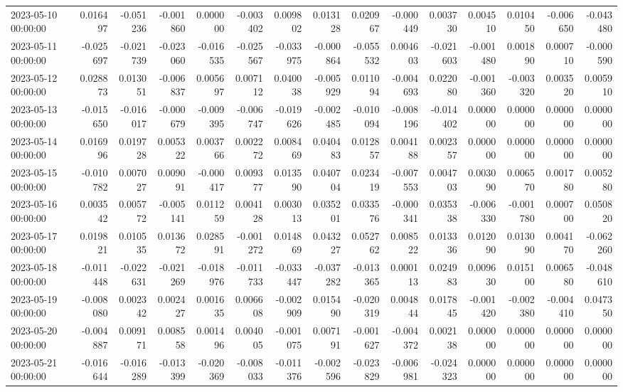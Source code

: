 \begin{tabular}{lrrrrrrrrrrrrrr}
2023-05-10 00:00:00 & 0.016497 & -0.051236 & -0.001860 & 0.000000 & -0.003402 & 0.009802 & 0.013128 & 0.020967 & -0.000449 & 0.003730 & 0.004510 & 0.010450 & -0.006650 & -0.043480 \\
2023-05-11 00:00:00 & -0.025697 & -0.021739 & -0.023060 & -0.016535 & -0.025567 & -0.033975 & -0.000864 & -0.055532 & 0.004603 & -0.021603 & -0.001480 & 0.001890 & 0.000710 & -0.000590 \\
2023-05-12 00:00:00 & 0.028873 & 0.013051 & -0.006837 & 0.005697 & 0.007112 & 0.040038 & -0.005929 & 0.011094 & -0.004693 & 0.022080 & -0.001360 & -0.003320 & 0.003520 & 0.005910 \\
2023-05-13 00:00:00 & -0.015650 & -0.016017 & -0.000679 & -0.009395 & -0.006747 & -0.019626 & -0.002485 & -0.010094 & -0.008196 & -0.014402 & 0.000000 & 0.000000 & 0.000000 & 0.000000 \\
2023-05-14 00:00:00 & 0.016996 & 0.019728 & 0.005322 & 0.003766 & 0.002272 & 0.008469 & 0.040483 & 0.012857 & 0.004188 & 0.002357 & 0.000000 & 0.000000 & 0.000000 & 0.000000 \\
2023-05-15 00:00:00 & -0.010782 & 0.007027 & 0.009091 & -0.000417 & 0.009377 & 0.013590 & 0.040704 & 0.023419 & -0.007553 & 0.004703 & 0.003090 & 0.006570 & 0.001780 & 0.005280 \\
2023-05-16 00:00:00 & 0.003542 & 0.005772 & -0.005141 & 0.011259 & 0.004128 & 0.003013 & 0.035201 & 0.033576 & -0.000341 & 0.035338 & -0.006330 & -0.001780 & 0.000700 & 0.050820 \\
2023-05-17 00:00:00 & 0.019821 & 0.010535 & 0.013672 & 0.028591 & -0.001272 & 0.014869 & 0.043227 & 0.052762 & 0.008522 & 0.013336 & 0.012090 & 0.013090 & 0.004170 & -0.062260 \\
2023-05-18 00:00:00 & -0.011448 & -0.022631 & -0.021269 & -0.018976 & -0.011733 & -0.033447 & -0.037282 & -0.013365 & 0.000113 & 0.024983 & 0.009630 & 0.015100 & 0.006580 & -0.048610 \\
2023-05-19 00:00:00 & -0.008080 & 0.002342 & 0.002427 & 0.001635 & 0.006608 & -0.002909 & 0.015490 & -0.020319 & 0.004844 & 0.017845 & -0.001420 & -0.002380 & -0.004410 & 0.047350 \\
2023-05-20 00:00:00 & -0.004887 & 0.009171 & 0.008558 & 0.001496 & 0.004005 & -0.001075 & 0.007191 & -0.001627 & -0.004372 & 0.002138 & 0.000000 & 0.000000 & 0.000000 & 0.000000 \\
2023-05-21 00:00:00 & -0.016644 & -0.016289 & -0.013399 & -0.020369 & -0.008033 & -0.011376 & -0.002596 & -0.023829 & -0.006981 & -0.024323 & 0.000000 & 0.000000 & 0.000000 & 0.000000 \\

\end{tabular}
